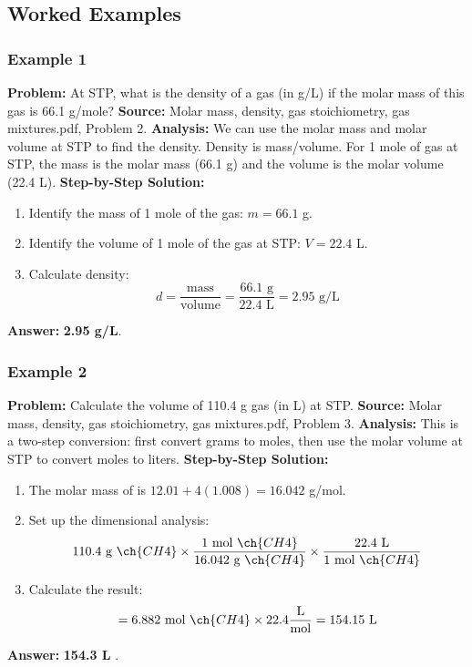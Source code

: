 \documentclass{article}
\begin{document}
\subsection{Worked Examples}
\subsubsection{Example 1}
\textbf{Problem:} At STP, what is the density of a gas (in g/L) if the molar mass of this gas is 66.1 g/mole?
\textbf{Source:} Molar mass, density, gas stoichiometry, gas mixtures.pdf, Problem 2.
\textbf{Analysis:} We can use the molar mass and molar volume at STP to find the density. Density is mass/volume. For 1 mole of gas at STP, the mass is the molar mass (66.1 g) and the volume is the molar volume (22.4 L).
\textbf{Step-by-Step Solution:}
\begin{enumerate}
    \item Identify the mass of 1 mole of the gas: $m = 66.1$ g.
    \item Identify the volume of 1 mole of the gas at STP: $V = 22.4$ L.
    \item Calculate density:
    \[ d = \frac{\text{mass}}{\text{volume}} = \frac{66.1 \text{ g}}{22.4 \text{ L}} = 2.95 \text{ g/L} \]
\end{enumerate}
\textbf{Answer:} \textbf{2.95 g/L}.

\subsubsection{Example 2}
\textbf{Problem:} Calculate the volume of 110.4 g  gas (in L) at STP.
\textbf{Source:} Molar mass, density, gas stoichiometry, gas mixtures.pdf, Problem 3.
\textbf{Analysis:} This is a two-step conversion: first convert grams to moles, then use the molar volume at STP to convert moles to liters.
\textbf{Step-by-Step Solution:}
\begin{enumerate}
    \item The molar mass of  is $12.01 + 4(1.008) = 16.042$ g/mol.
    \item Set up the dimensional analysis:
    \[ 110.4 \text{ g } \ch{CH4} \times \frac{1 \text{ mol } \ch{CH4}}{16.042 \text{ g } \ch{CH4}} \times \frac{22.4 \text{ L}}{1 \text{ mol } \ch{CH4}} \]
    \item Calculate the result:
    \[ = 6.882 \text{ mol } \ch{CH4} \times 22.4 \frac{\text{L}}{\text{mol}} = 154.15 \text{ L} \]
\end{enumerate}
\textbf{Answer:} \textbf{154.3 L }.
\end{document}
